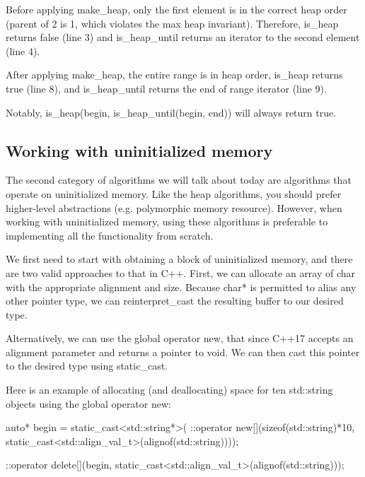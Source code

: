 Before applying make\_heap, only the first element is in the correct heap order (parent of 2 is 1, which violates the max heap invariant). Therefore, is\_heap returns false (line 3) and is\_heap\_until returns an iterator to the second element (line 4).

After applying make\_heap, the entire range is in heap order, is\_heap returns true (line 8), and is\_heap\_until returns the end of range iterator (line 9).

Notably, is\_heap(begin, is\_heap\_until(begin, end)) will always return true.

\subsection{Working with uninitialized memory}

The second category of algorithms we will talk about today are algorithms that operate on uninitialized memory. Like the heap algorithms, you should prefer higher-level abstractions (e.g. polymorphic memory resource). However, when working with uninitialized memory, using these algorithms is preferable to implementing all the functionality from scratch.

We first need to start with obtaining a block of uninitialized memory, and there are two valid approaches to that in C++. First, we can allocate an array of char with the appropriate alignment and size. Because char* is permitted to alias any other pointer type, we can reinterpret\_cast the resulting buffer to our desired type.

Alternatively, we can use the global operator new, that since C++17 accepts an alignment parameter and returns a pointer to void. We can then cast this pointer to the desired type using static\_cast.

Here is an example of allocating (and deallocating) space for ten std::string objects using the global operator new:

\begin{box-note}
\begin{cppcode}
auto* begin = static_cast<std::string*>(
                  ::operator new[](sizeof(std::string)*10, 
                                   static_cast<std::align_val_t>(alignof(std::string))));

::operator delete[](begin, static_cast<std::align_val_t>(alignof(std::string)));
\end{cppcode}
\end{box-note}

